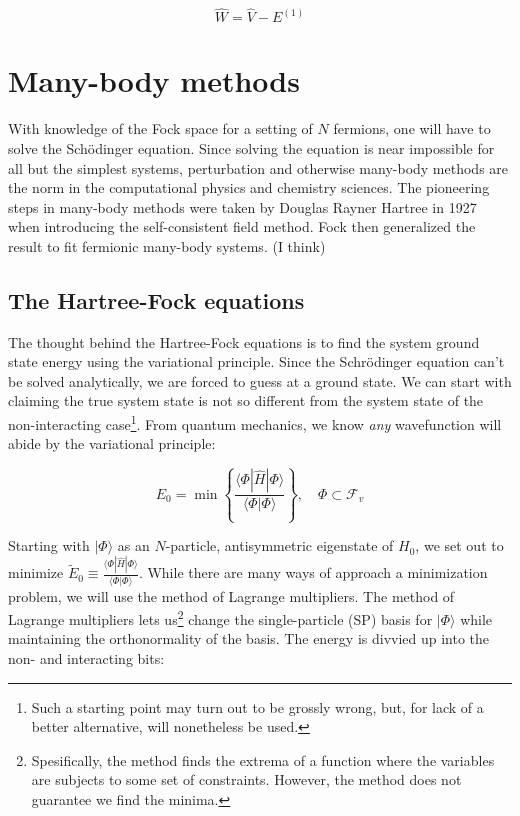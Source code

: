 \documentclass[10pt]{report}
\begin{document}
	\begin{equation}
		\hat{W} = \hat{V}-E^{(1)}
	\end{equation}
	
	\section{Many-body methods}
	With knowledge of the Fock space for a setting of $N$ fermions, one will have to solve the Sch\"odinger equation. Since solving the equation is near impossible for all but the simplest systems, perturbation and otherwise many-body methods are the norm in the computational physics and chemistry sciences. The pioneering steps in many-body methods were taken by Douglas Rayner Hartree in 1927 when introducing the self-consistent field method. Fock then generalized the result to fit fermionic many-body systems. (I think)
	
	\subsection{The Hartree-Fock equations}
	The thought behind the Hartree-Fock equations is to find the system ground state energy using the variational principle. Since the Schr\"odinger equation can't be solved analytically, we are forced to guess at a ground state. We can start with claiming the true system state is not so different from the system state of the non-interacting case\footnote{Such a starting point may turn out to be grossly wrong, but, for lack of a better alternative, will nonetheless be used.}. From quantum mechanics, we know \emph{any} wavefunction will abide by the variational principle:
	
	\begin{equation}
		E_0 = \min\left\{\frac{\langle\Phi|\hat{H}|\Phi\rangle}{\langle\Phi|\Phi\rangle}\right\} ,\quad \Phi \subset \mathcal{F}_v
	\end{equation}
	
	Starting with $|\Phi\rangle$ as an $N$-particle, antisymmetric eigenstate of $H_0$, we set out to minimize $\widetilde{E}_0 \equiv \frac{\langle\Phi|\hat{H}|\Phi\rangle}{\langle\Phi|\Phi\rangle}$. While there are many ways of approach a minimization problem, we will use the method of Lagrange multipliers. The method of Lagrange multipliers lets us\footnote{Spesifically, the method finds the extrema of a function where the variables are subjects to some set of constraints. However, the method does not guarantee we find the minima.} change the single-particle (SP) basis for $|\Phi\rangle$ while maintaining the orthonormality of the basis. The energy is divvied up into the non- and interacting bits: 
	
\end{document}

